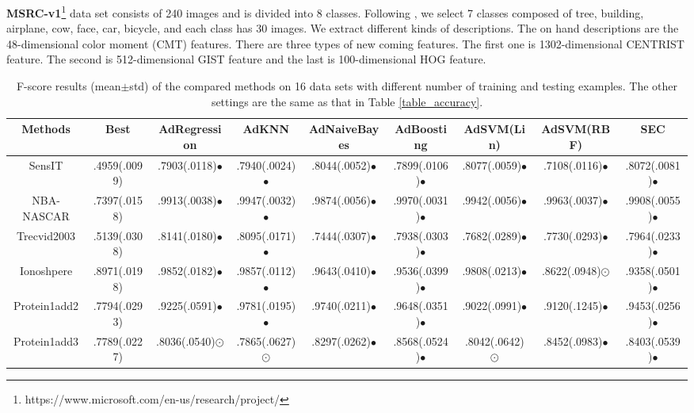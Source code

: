 \documentclass[10pt,journal,compsoc]{IEEEtran}
\begin{document}
\textbf{MSRC-v1}\footnote{https://www.microsoft.com/en-us/research/project/} data set consists of 240 images and is divided into 8 classes. Following \cite{ijcv/LeeG09}, we select 7 classes composed of tree, building, airplane, cow, face, car, bicycle, and each class has 30 images. We extract different kinds of descriptions. The on hand descriptions are the 48-dimensional color moment (CMT) features. There are three types of new coming features. The first one is 1302-dimensional CENTRIST feature. The second is 512-dimensional GIST feature and the last is 100-dimensional HOG feature.

\begin{table*}[!t]
\caption{F-score results (mean$\pm$std) of the compared methods on 16 data sets with different number of training and testing examples. The other settings are the same as that in Table \ref{table_accuracy}.}
\label{table_fscore}
\centering
\vskip -0.1in
{
\begin{tabular}{c|| c c c c c c c c }
\hline
  Methods       &  Best   &  AdRegression   & AdKNN    & AdNaiveBayes    & AdBoosting &  AdSVM(Lin) & AdSVM(RBF) & SEC \\
\hline
SensIT          & .4959(.0099) & .7903(.0118)$\bullet$ & .7940(.0024)$\bullet$ & .8044(.0052)$\bullet$ & .7899(.0106)$\bullet$ & .8077(.0059)$\bullet$ & .7108(.0116)$\bullet$ & .8072(.0081)$\bullet$ \\
NBA-NASCAR      & .7397(.0158) & .9913(.0038)$\bullet$ & .9947(.0032)$\bullet$ & .9874(.0056)$\bullet$ & .9970(.0031)$\bullet$ & .9942(.0056)$\bullet$ & .9963(.0037)$\bullet$ & .9908(.0055)$\bullet$ \\
Trecvid2003     & .5139(.0308) & .8141(.0180)$\bullet$ & .8095(.0171)$\bullet$ & .7444(.0307)$\bullet$ & .7938(.0303)$\bullet$ & .7682(.0289)$\bullet$ & .7730(.0293)$\bullet$ & .7964(.0233)$\bullet$ \\
Ionoshpere      & .8971(.0198) & .9852(.0182)$\bullet$ & .9857(.0112)$\bullet$ & .9643(.0410)$\bullet$ & .9536(.0399)$\bullet$ & .9808(.0213)$\bullet$ & .8622(.0948){\tiny $\odot$} & .9358(.0501)$\bullet$ \\
Protein1add2    & .7794(.0293) & .9225(.0591)$\bullet$ & .9781(.0195)$\bullet$ & .9740(.0211)$\bullet$ & .9648(.0351)$\bullet$ & .9022(.0991)$\bullet$ & .9120(.1245)$\bullet$ & .9453(.0256)$\bullet$ \\
Protein1add3    & .7789(.0227) & .8036(.0540){\tiny $\odot$} & .7865(.0627){\tiny $\odot$} & .8297(.0262)$\bullet$ & .8568(.0524)$\bullet$ & .8042(.0642){\tiny $\odot$} & .8452(.0983)$\bullet$ & .8403(.0539)$\bullet$ \\

\end{tabular}}
\end{table*}
\end{document}

